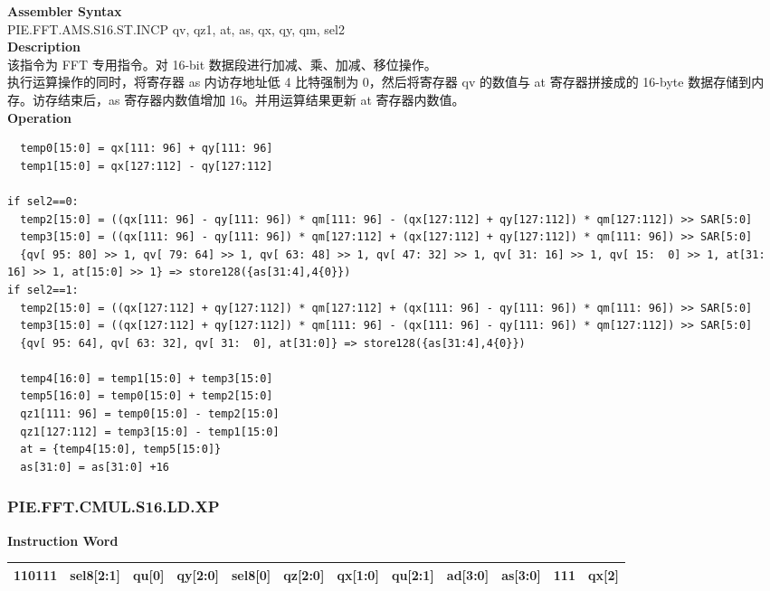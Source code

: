 \textbf{Assembler Syntax} \\
PIE.FFT.AMS.S16.ST.INCP qv, qz1, at, as, qx, qy, qm, sel2 \\
\textbf{Description} \\
该指令为 FFT 专用指令。对 16-bit 数据段进行加减、乘、加减、移位操作。\\
执行运算操作的同时，将寄存器 as 内访存地址低 4 比特强制为 0，然后将寄存器 qv 的数值与 at 寄存器拼接成的 16-byte 数据存储到内存。访存结束后，as 寄存器内数值增加 16。并用运算结果更新 at 寄存器内数值。\\
\textbf{Operation}
\begin{lstlisting}
  temp0[15:0] = qx[111: 96] + qy[111: 96]
  temp1[15:0] = qx[127:112] - qy[127:112]

if sel2==0:
  temp2[15:0] = ((qx[111: 96] - qy[111: 96]) * qm[111: 96] - (qx[127:112] + qy[127:112]) * qm[127:112]) >> SAR[5:0]
  temp3[15:0] = ((qx[111: 96] - qy[111: 96]) * qm[127:112] + (qx[127:112] + qy[127:112]) * qm[111: 96]) >> SAR[5:0]
  {qv[ 95: 80] >> 1, qv[ 79: 64] >> 1, qv[ 63: 48] >> 1, qv[ 47: 32] >> 1, qv[ 31: 16] >> 1, qv[ 15:  0] >> 1, at[31: 16] >> 1, at[15:0] >> 1} => store128({as[31:4],4{0}})
if sel2==1:
  temp2[15:0] = ((qx[127:112] + qy[127:112]) * qm[127:112] + (qx[111: 96] - qy[111: 96]) * qm[111: 96]) >> SAR[5:0]
  temp3[15:0] = ((qx[127:112] + qy[127:112]) * qm[111: 96] - (qx[111: 96] - qy[111: 96]) * qm[127:112]) >> SAR[5:0]
  {qv[ 95: 64], qv[ 63: 32], qv[ 31:  0], at[31:0]} => store128({as[31:4],4{0}})

  temp4[16:0] = temp1[15:0] + temp3[15:0]
  temp5[16:0] = temp0[15:0] + temp2[15:0]
  qz1[111: 96] = temp0[15:0] - temp2[15:0]
  qz1[127:112] = temp3[15:0] - temp1[15:0]
  at = {temp4[15:0], temp5[15:0]}
  as[31:0] = as[31:0] +16
\end{lstlisting}

\newpage
\subsubsection{PIE.FFT.CMUL.S16.LD.XP}\label{instruction:PIEFFTCMULS16LDXP}
\setlength\tabcolsep{6pt}
\textbf{Instruction Word} \\
\begin{tabular}{|c|c|c|c|c|c|c|c|c|c|c|c|}
	\hline
	110111 & sel8[2:1] & qu[0] & qy[2:0] & sel8[0] & qz[2:0] & qx[1:0] & qu[2:1] & ad[3:0] & as[3:0] & 111 & qx[2] \\
	\hline
\end{tabular}

